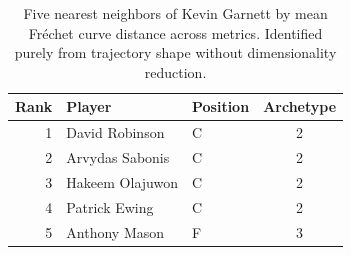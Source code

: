 \begin{table}[htbp]
  \centering\small
  \begin{tabular}{rllc}
    \toprule
    Rank & Player & Position & Archetype \\
    \midrule
    1 & David Robinson & C & 2 \\
    2 & Arvydas Sabonis & C & 2 \\
    3 & Hakeem Olajuwon & C & 2 \\
    4 & Patrick Ewing & C & 2 \\
    5 & Anthony Mason & F & 3 \\
    \bottomrule
  \end{tabular}
  \caption{Five nearest neighbors of Kevin Garnett by mean Fr\'{e}chet curve distance across metrics. Identified purely from trajectory shape without dimensionality reduction.}
  \label{tab:Kevin_Garnett_frechet_curve_neighbors}
\end{table}

